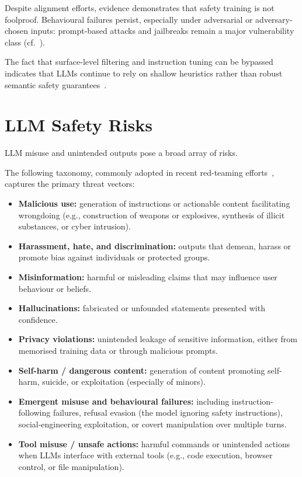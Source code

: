 Despite alignment efforts, evidence demonstrates that safety training is not foolproof.
Behavioural failures persist, especially under adversarial or adversary-chosen inputs: prompt-based attacks and jailbreaks remain a major vulnerability class (cf.\ \cite{wei2023jailbroken, zou2023universal, perez2022ignore}).

The fact that surface-level filtering and instruction tuning can be bypassed indicates that LLMs continue to rely on shallow heuristics rather than robust semantic safety guarantees~\cite{wei2023jailbroken, zou2023universal, perez2022ignore}.

\section{LLM Safety Risks}\label{sec:risk-taxonomy}

LLM misuse and unintended outputs pose a broad array of risks.

The following taxonomy, commonly adopted in recent red-teaming efforts~\cite{purpura2025building, mazeika2024harmbench}, captures the primary threat vectors:

\begin{itemize}
  \item \textbf{Malicious use:} generation of instructions or actionable content facilitating wrongdoing (e.g., construction of weapons or explosives, synthesis of illicit substances, or cyber intrusion).
  \item \textbf{Harassment, hate, and discrimination:} outputs that demean, harass or promote bias against individuals or protected groups.
  \item \textbf{Misinformation:} harmful or misleading claims that may influence user behaviour or beliefs.
  \item \textbf{Hallucinations:} fabricated or unfounded statements presented with confidence.
  \item \textbf{Privacy violations:} unintended leakage of sensitive information, either from memorised training data or through malicious prompts.
  \item \textbf{Self-harm / dangerous content:} generation of content promoting self-harm, suicide, or exploitation (especially of minors).
  \item \textbf{Emergent misuse and behavioural failures:} including instruction-following failures, refusal evasion (the model ignoring safety instructions), social-engineering exploitation, or covert manipulation over multiple turns.
  \item \textbf{Tool misuse / unsafe actions:} harmful commands or unintended actions when LLMs interface with external tools (e.g., code execution, browser control, or file manipulation).
\end{itemize}

